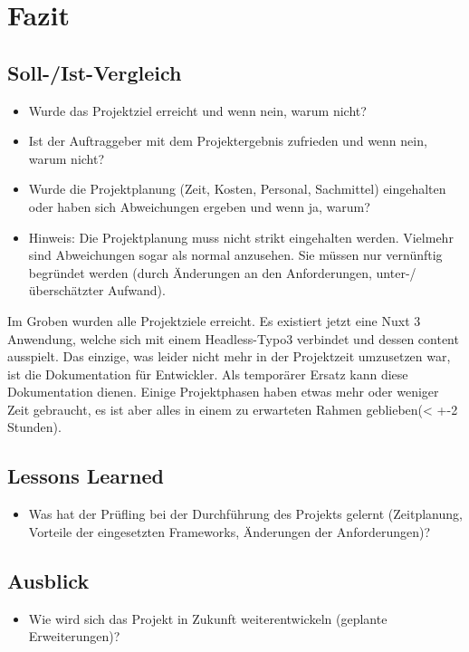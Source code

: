 \section{Fazit} 
\label{sec:Fazit}

\subsection{Soll-/Ist-Vergleich}
\label{sec:SollIstVergleich}

\begin{itemize}
	\item Wurde das Projektziel erreicht und wenn nein, warum nicht?
	\item Ist der Auftraggeber mit dem Projektergebnis zufrieden und wenn nein, warum nicht?
	\item Wurde die Projektplanung (Zeit, Kosten, Personal, Sachmittel) eingehalten oder haben sich Abweichungen ergeben und wenn ja, warum?
	\item Hinweis: Die Projektplanung muss nicht strikt eingehalten werden. Vielmehr sind Abweichungen sogar als normal anzusehen. Sie müssen nur vernünftig begründet werden (\zB durch Änderungen an den Anforderungen, unter-/überschätzter Aufwand).
\end{itemize}

Im Groben wurden alle Projektziele erreicht. Es existiert jetzt eine Nuxt 3 Anwendung, welche sich mit einem Headless-Typo3 verbindet und dessen content ausspielt. Das einzige, was leider nicht mehr in der Projektzeit umzusetzen war, ist die Dokumentation für Entwickler. Als temporärer Ersatz kann diese Dokumentation dienen. Einige Projektphasen haben etwas mehr oder weniger Zeit gebraucht, es ist aber alles in einem zu erwarteten Rahmen geblieben(< +-2 Stunden).



\subsection{Lessons Learned}
\label{sec:LessonsLearned}

\begin{itemize}
	\item Was hat der Prüfling bei der Durchführung des Projekts gelernt (\zB Zeitplanung, Vorteile der eingesetzten Frameworks, Änderungen der Anforderungen)?
\end{itemize}

\subsection{Ausblick}
\label{sec:Ausblick}

\begin{itemize}
	\item Wie wird sich das Projekt in Zukunft weiterentwickeln (\zB geplante Erweiterungen)?
\end{itemize}
